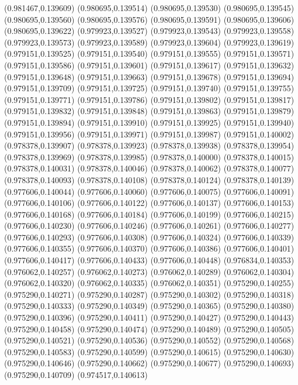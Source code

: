 (0.981467,0.139609)
(0.980695,0.139514)
(0.980695,0.139530)
(0.980695,0.139545)
(0.980695,0.139560)
(0.980695,0.139576)
(0.980695,0.139591)
(0.980695,0.139606)
(0.980695,0.139622)
(0.979923,0.139527)
(0.979923,0.139543)
(0.979923,0.139558)
(0.979923,0.139573)
(0.979923,0.139589)
(0.979923,0.139604)
(0.979923,0.139619)
(0.979151,0.139525)
(0.979151,0.139540)
(0.979151,0.139555)
(0.979151,0.139571)
(0.979151,0.139586)
(0.979151,0.139601)
(0.979151,0.139617)
(0.979151,0.139632)
(0.979151,0.139648)
(0.979151,0.139663)
(0.979151,0.139678)
(0.979151,0.139694)
(0.979151,0.139709)
(0.979151,0.139725)
(0.979151,0.139740)
(0.979151,0.139755)
(0.979151,0.139771)
(0.979151,0.139786)
(0.979151,0.139802)
(0.979151,0.139817)
(0.979151,0.139832)
(0.979151,0.139848)
(0.979151,0.139863)
(0.979151,0.139879)
(0.979151,0.139894)
(0.979151,0.139910)
(0.979151,0.139925)
(0.979151,0.139940)
(0.979151,0.139956)
(0.979151,0.139971)
(0.979151,0.139987)
(0.979151,0.140002)
(0.978378,0.139907)
(0.978378,0.139923)
(0.978378,0.139938)
(0.978378,0.139954)
(0.978378,0.139969)
(0.978378,0.139985)
(0.978378,0.140000)
(0.978378,0.140015)
(0.978378,0.140031)
(0.978378,0.140046)
(0.978378,0.140062)
(0.978378,0.140077)
(0.978378,0.140093)
(0.978378,0.140108)
(0.978378,0.140124)
(0.978378,0.140139)
(0.977606,0.140044)
(0.977606,0.140060)
(0.977606,0.140075)
(0.977606,0.140091)
(0.977606,0.140106)
(0.977606,0.140122)
(0.977606,0.140137)
(0.977606,0.140153)
(0.977606,0.140168)
(0.977606,0.140184)
(0.977606,0.140199)
(0.977606,0.140215)
(0.977606,0.140230)
(0.977606,0.140246)
(0.977606,0.140261)
(0.977606,0.140277)
(0.977606,0.140293)
(0.977606,0.140308)
(0.977606,0.140324)
(0.977606,0.140339)
(0.977606,0.140355)
(0.977606,0.140370)
(0.977606,0.140386)
(0.977606,0.140401)
(0.977606,0.140417)
(0.977606,0.140433)
(0.977606,0.140448)
(0.976834,0.140353)
(0.976062,0.140257)
(0.976062,0.140273)
(0.976062,0.140289)
(0.976062,0.140304)
(0.976062,0.140320)
(0.976062,0.140335)
(0.976062,0.140351)
(0.975290,0.140255)
(0.975290,0.140271)
(0.975290,0.140287)
(0.975290,0.140302)
(0.975290,0.140318)
(0.975290,0.140333)
(0.975290,0.140349)
(0.975290,0.140365)
(0.975290,0.140380)
(0.975290,0.140396)
(0.975290,0.140411)
(0.975290,0.140427)
(0.975290,0.140443)
(0.975290,0.140458)
(0.975290,0.140474)
(0.975290,0.140489)
(0.975290,0.140505)
(0.975290,0.140521)
(0.975290,0.140536)
(0.975290,0.140552)
(0.975290,0.140568)
(0.975290,0.140583)
(0.975290,0.140599)
(0.975290,0.140615)
(0.975290,0.140630)
(0.975290,0.140646)
(0.975290,0.140662)
(0.975290,0.140677)
(0.975290,0.140693)
(0.975290,0.140709)
(0.974517,0.140613)
